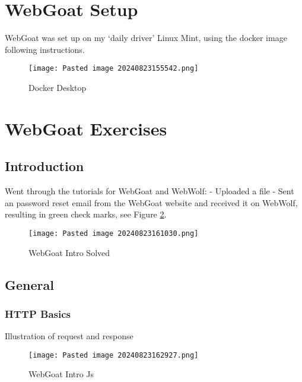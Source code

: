 \documentclass[
	letterpaper, %
	10pt, %
	unnumberedsections, %
	twoside, %
]{APAAssignment}
\begin{document}
\clearpage
\begin{appendices}


\section{WebGoat Setup}\label{app:webgoat-setup}

WebGoat was set up on my `daily driver' Linux Mint, using the docker
image following instructions.

\begin{figure}[!h] %
	\texttt{[image: Pasted image 20240823155542.png]}
	\caption{Docker Desktop}
	\label{fig:Docker-Desktop}
\end{figure}

\section{WebGoat Exercises}\label{app:webgoat-exercises}

\subsection{Introduction}\label{app:introduction}
Went through the tutorials for WebGoat and WebWolf: - Uploaded a file -
Sent an password reset email from the WebGoat website and received it on
WebWolf, resulting in green check marks, see Figure \ref{fig:WebGoatIntro}. 

\begin{figure}[!ht] %
	\centering
	\texttt{[image: Pasted image 20240823161030.png]}
	\caption{WebGoat Intro Solved}
	\label{fig:WebGoatIntro}
\end{figure}


\subsection{General}\label{app:general}
\subsubsection{HTTP Basics}

Illustration of request and response 

\begin{figure}[!ht] %
	\centering
	\texttt{[image: Pasted image 20240823162927.png]}
	\caption{WebGoat Intro Js}
	\label{fig:Intro Js}
\end{figure}



\end{appendices}
\end{document}
